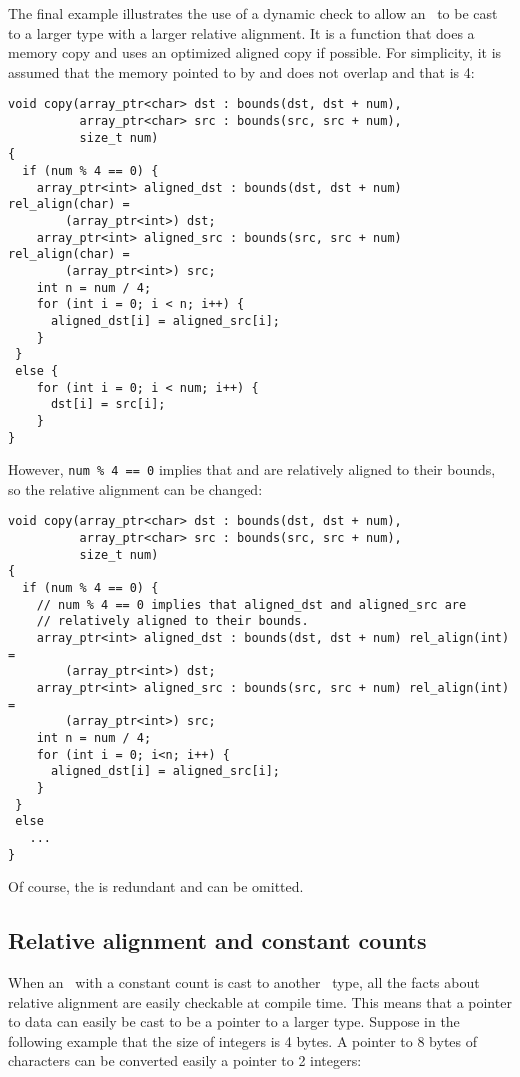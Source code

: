 The final example illustrates the use of a dynamic check to allow an
\arrayptrchar\ to be cast to a larger type with a larger relative alignment.
It is a function that does a memory copy and uses an optimized aligned copy if
possible.  For simplicity, it is assumed that the memory pointed to by
 and  does not overlap and that  is 4:
\begin{lstlisting}
void copy(array_ptr<char> dst : bounds(dst, dst + num),
          array_ptr<char> src : bounds(src, src + num),
          size_t num)
{
  if (num % 4 == 0) {
    array_ptr<int> aligned_dst : bounds(dst, dst + num) rel_align(char) =
        (array_ptr<int>) dst;
    array_ptr<int> aligned_src : bounds(src, src + num) rel_align(char) =
        (array_ptr<int>) src;
    int n = num / 4;
    for (int i = 0; i < n; i++) {
      aligned_dst[i] = aligned_src[i];
    }
 }
 else {
    for (int i = 0; i < num; i++) {
      dst[i] = src[i];
    }
}
\end{lstlisting}

However, \lstinline|num % 4 == 0| implies that  and
 are relatively aligned to their bounds, so the
relative alignment can be changed:

\begin{lstlisting}
void copy(array_ptr<char> dst : bounds(dst, dst + num),
          array_ptr<char> src : bounds(src, src + num),
          size_t num)
{
  if (num % 4 == 0) {
    // num % 4 == 0 implies that aligned_dst and aligned_src are
    // relatively aligned to their bounds.
    array_ptr<int> aligned_dst : bounds(dst, dst + num) rel_align(int) =
        (array_ptr<int>) dst;
    array_ptr<int> aligned_src : bounds(src, src + num) rel_align(int) =
        (array_ptr<int>) src;
    int n = num / 4;
    for (int i = 0; i<n; i++) {
      aligned_dst[i] = aligned_src[i];
    }
 }
 else
   ...
}
\end{lstlisting}

Of course, the  is redundant and can be omitted.

\subsection{Relative alignment and constant counts}

When an \arrayptr\ with a constant count is cast to another
\arrayptr\ type, all the facts about relative alignment are
easily checkable at compile time. This means that a pointer to data can
easily be cast to be a pointer to a larger type. Suppose in the
following example that the size of integers is 4 bytes. A pointer to 8
bytes of characters can be converted easily a pointer to 2 integers:

